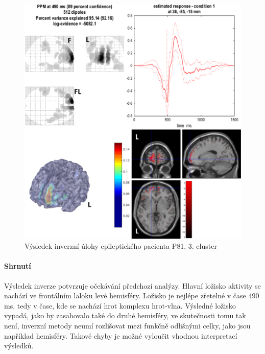 \begin{figure}[!h]
\includegraphics[width=1.0\textwidth]{casti/aplikace/epilepsie/3cl.png}
\caption{Výsledek inverzní úlohy epileptického pacienta P81, 3. cluster}
\label{epilepsieCluster3}
\end{figure}

\paragraph{Shrnutí}
Výsledek inverze potvrzuje očekávání předchozí analýzy. Hlavní ložisko aktivity se nachází ve frontálním laloku levé hemisféry. Ložisko je nejlépe zřetelné v čase 490 ms, tedy v čase, kde se nachází hrot komplexu hrot-vlna. Výsledné ložisko vypadá, jako by zasahovalo také do druhé hemisféry, ve skutečnosti tomu tak není, inverzní metody neumí rozlišovat mezi funkčně odlišnými celky, jako jsou například hemisféry. Takové chyby je možné vyloučit vhodnou interpretací výsledků. 